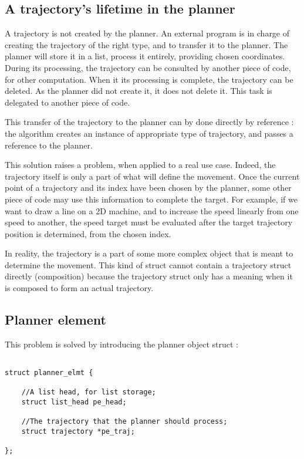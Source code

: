 \subsection{A trajectory's lifetime in the planner}

A trajectory is not created by the planner. An external program is in charge of creating the trajectory of 
the right type, and to transfer it to the planner. 
The planner will store it in a list, process it entirely, providing chosen coordinates.
During its processing, the trajectory can be consulted by another piece of code, for other computation.
When it its processing is complete, the trajectory can be deleted. As the planner did not create it, it 
does not delete it. This task is delegated to another piece of code. 
\newline

This transfer of the trajectory to the planner can by done directly by reference : the algorithm creates an 
instance of appropriate type of trajectory, and passes a reference to the planner. 
\newline

This solution raises a problem, when applied to a real use case. Indeed, the trajectory itself
is only a part of what will define the movement. Once the current point of a trajectory and its index
have been chosen by the planner, some other piece of code may use this information to complete the target.
For example, if we want to draw a line on a 2D machine, and to increase the speed linearly from one speed to 
another, the speed target must be evaluated after the target trajectory position is determined, from the
chosen index.
\newline

\newpage

In reality, the trajectory is a part of some more complex object that is meant to determine the movement.
This kind of struct cannot contain a trajectory struct directly (composition) because the trajectory struct
only has a meaning when it is composed to form an actual trajectory. 
\newline

\subsection{Planner element}

This problem is solved by introducing the planner object struct : 

\begin{lstlisting}[style=CStyle]  

struct planner_elmt {
	
	//A list head, for list storage;
	struct list_head pe_head;
	
	//The trajectory that the planner should process;
	struct trajectory *pe_traj;
	
};

\end{lstlisting}

